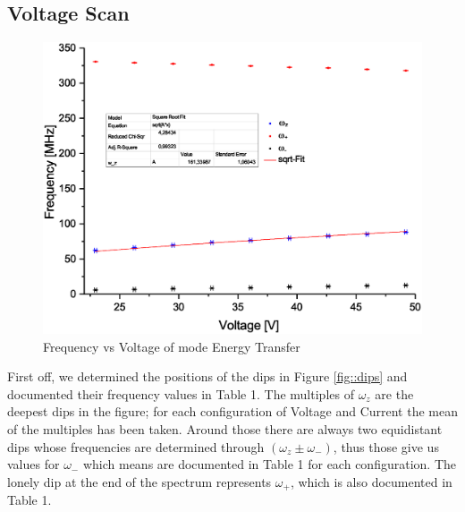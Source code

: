 \documentclass[12pt]{article}
\begin{document}
\subsection{Voltage Scan}

\begin{figure}[h]
  \centering
  \includegraphics[width=20cm,bbllx=112,bburx=447,bblly=264,bbury=582]{Graph3.eps}
  \caption{Frequency vs Voltage of mode Energy Transfer}
  \label{fig::dips}
\end{figure}

First off, we determined the positions of the dips in Figure \eqref{fig::dips} and documented their frequency values in Table 1. The multiples of $\omega_z$ are the deepest dips in the figure; for each configuration of Voltage and Current the mean of the multiples has been taken. Around those there are always two equidistant dips whose frequencies are determined through $(\omega_z \pm \omega_-)$, thus those give us values for $\omega_-$ which means are documented in Table 1 for each configuration.
The lonely dip at the end of the spectrum represents $\omega_+$, which is also documented in Table 1.

\end{document}
